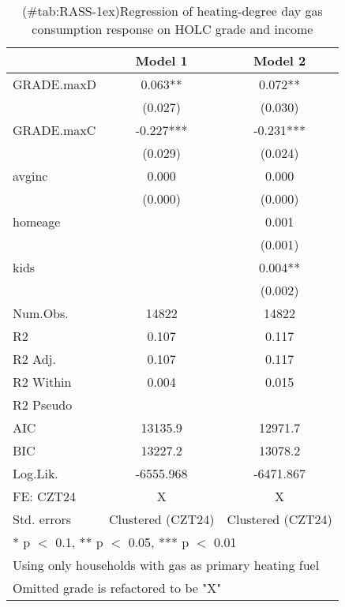 \documentclass[
]{article}
\begin{document}
\begin{table}

\caption{(\#tab:RASS-1ex)Regression of heating-degree day gas consumption response on HOLC grade and income \label{tab:responsegas1}}
\centering
\begin{tabular}[t]{lcc}
\toprule
  & Model 1 & Model 2\\
\midrule
GRADE.maxD & 0.063** & 0.072**\\
 & (0.027) & (0.030)\\
GRADE.maxC & -0.227*** & -0.231***\\
 & (0.029) & (0.024)\\
avginc & 0.000 & 0.000\\
 & (0.000) & (0.000)\\
homeage &  & 0.001\\
 &  & (0.001)\\
kids &  & 0.004**\\
 &  & (0.002)\\
\midrule
Num.Obs. & 14822 & 14822\\
R2 & 0.107 & 0.117\\
R2 Adj. & 0.107 & 0.117\\
R2 Within & 0.004 & 0.015\\
R2 Pseudo &  & \\
AIC & 13135.9 & 12971.7\\
BIC & 13227.2 & 13078.2\\
Log.Lik. & -6555.968 & -6471.867\\
FE: CZT24 & X & X\\
Std. errors & Clustered (CZT24) & Clustered (CZT24)\\
\bottomrule
\multicolumn{3}{l}{\textsuperscript{} * p $<$ 0.1, ** p $<$ 0.05, *** p $<$ 0.01}\\
\multicolumn{3}{l}{\textsuperscript{} Using only households with gas as primary heating fuel}\\
\multicolumn{3}{l}{\textsuperscript{} Omitted grade is refactored to be "X"}\\
\end{tabular}
\end{table}
\end{document}
